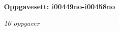 \centerline{\bf Oppgavesett: i00449no-i00458no}
\vskip 10pt
\centerline{\it 10 oppgaver}\vskip 10pt
\vskip 10pt
